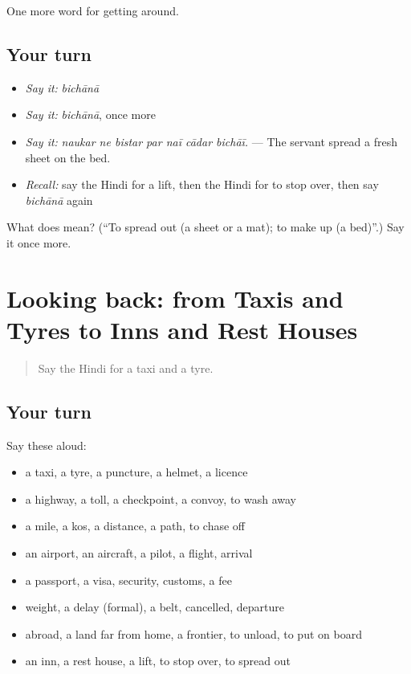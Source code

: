 \begin{grammarlens}[title={What you've built}]
One more word for getting around.
\end{grammarlens}

\subsection*{Your turn}
\begin{itemize}
\raggedright
  \item \emph{Say it:} \emph{bichānā}
  \item \emph{Say it:} \emph{bichānā}, once more
  \item \emph{Say it:} \emph{naukar ne bistar par naī cādar bichāī.} — The servant spread a fresh sheet on the bed.
  \item \emph{Recall:} say the Hindi for a lift, then the Hindi for to stop over, then say \emph{bichānā} again
\end{itemize}

\begin{tcolorbox}[breakable,colback=teal!4,colframe=teal!35!black,title={Before you move on}]
What does  mean? (\textquotedblleft{}To spread out (a sheet or a mat); to make up (a bed)\textquotedblright{}.) Say it once more.
\end{tcolorbox}
\section[(dialogue)]{Looking back: from Taxis and Tyres to Inns and Rest Houses}

\label{lesson:HI-R413-review-406-413}



\begin{quote}
Say the Hindi for a taxi and a tyre.
\end{quote}

\subsection*{Your turn}
Say these aloud:

\begin{itemize}
\raggedright
  \item a taxi, a tyre, a puncture, a helmet, a licence
  \item a highway, a toll, a checkpoint, a convoy, to wash away
  \item a mile, a kos, a distance, a path, to chase off
  \item an airport, an aircraft, a pilot, a flight, arrival
  \item a passport, a visa, security, customs, a fee
  \item weight, a delay (formal), a belt, cancelled, departure
  \item abroad, a land far from home, a frontier, to unload, to put on board
  \item an inn, a rest house, a lift, to stop over, to spread out
\end{itemize}

